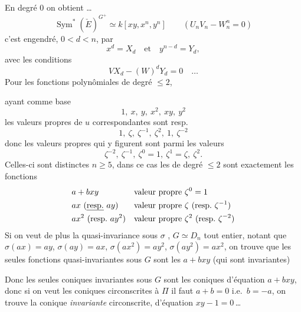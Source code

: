 \documentclass[11pt,a4paper]{article}
\begin{document}
 En degré $0$ on obtient   \ldots{}
\[
\operatorname{Sym}^{*}(\check{E})^{G^{+}} \simeq k[xy, x^{n}, y^{n}]
\qquad (U_n V_n - W_n^{n} = 0)
\]
c'est engendré,  $0 < d < n$, par
\[
x^{d} = X_d \quad\text{et}\quad y^{n-d} = Y_d,
\]
avec les conditions
\[
V X_d - (W)^{d} Y_d = 0 \quad \ldots
\]
Pour les fonctions polynômiales de degré $\leq 2$,

ayant comme base
\[
1,\ x,\ y,\ x^{2},\ xy,\ y^{2}
\]
les valeurs propres de $u$ correspondantes sont resp.
\[
1,\ \zeta,\ \zeta^{-1},\ \zeta^{2},\ 1,\ \zeta^{-2}
\]
donc les valeurs propres qui y figurent sont  parmi les  valeurs
\[
\zeta^{-2},\ \zeta^{-1},\ \zeta^{0} = 1,\ \zeta^{1} = \zeta,\ \zeta^{2}.
\]
Celles-ci sont  distinctes  $n \geq 5$, dans ce cas les     de degré $\leq 2$ \struck{\ill{}} sont exactement les fonctions
\[
\begin{aligned}
&a + bxy && \text{valeur propre } \zeta^{0} = 1 \\
&ax \ (\text{\uncertain{resp.}}\ ay) && \text{valeur propre } \zeta\ (\text{resp.\ } \zeta^{-1}) \\
&ax^{2}\ (\text{resp.\ } ay^{2}) && \text{valeur propre } \zeta^{2}\ (\text{resp.\ } \zeta^{-2})
\end{aligned}
\]
Si on veut de plus la quasi-invariance sous $\sigma$ , \struck{\ill{}} $G \simeq D_n$ tout entier, notant que $\sigma(ax) = ay$, $\sigma(ay) = ax$, $\sigma(ax^{2}) = ay^{2}$, $\sigma(ay^{2}) = ax^{2}$, on trouve que les seules fonctions  quasi-invariantes sous $G$ sont les $a + bxy$ (qui sont invariantes)

Donc les seules coniques invariantes sous $G$ sont les coniques d'équation $a + bxy$, donc si on veut les coniques circonscrites à $\Pi$ il faut $a + b = 0$ i.e.\ $b = -a$, on trouve la  conique \emph{invariante} circonscrite, d'équation $xy - 1 = 0$\,…
\end{document}
